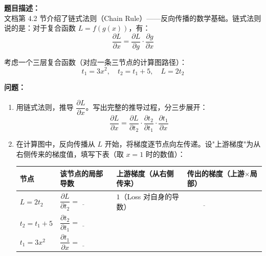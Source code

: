 \documentclass[a4paper,11pt]{ctexart}
\begin{document}
\begin{problembox}
    \textbf{题目描述：}\\
    文档第 4.2 节介绍了链式法则（Chain Rule）——反向传播的数学基础。链式法则说的是：对于复合函数 $L = f(g(x))$，有：
    \[
    \frac{\partial L}{\partial x} = \frac{\partial L}{\partial g} \cdot \frac{\partial g}{\partial x}
    \]

    \vspace{0.3cm}
    考虑一个三层复合函数（对应一条三节点的计算图路径）：
    \[
    t_1 = 3x^2, \quad t_2 = t_1 + 5, \quad L = 2t_2
    \]

    \textbf{问题：}
    \begin{enumerate}[(1)]
        \item 用链式法则，推导 $\dfrac{\partial L}{\partial x}$。写出完整的推导过程，分三步展开：
        \[
        \frac{\partial L}{\partial x} = \frac{\partial L}{\partial t_2} \cdot \frac{\partial t_2}{\partial t_1} \cdot \frac{\partial t_1}{\partial x}
        \]

        \item 在计算图中，反向传播从 $L$ 开始，将梯度逐节点向左传递。设"上游梯度"为从右侧传来的梯度值，填写下表（取 $x=1$ 时的数值）：

        \begin{center}
        \begin{tabular}{p{1.5cm} p{3.5cm} p{3.5cm} p{3.0cm}}
            \toprule
            节点 & 该节点的局部导数 & 上游梯度（从右侧传来） & 传出的梯度（上游$\times$局部） \\
            \midrule
            $L=2t_2$ & $\dfrac{\partial L}{\partial t_2} = \underline{\quad}$ & $1$（Loss 对自身的导数） & $\underline{\hspace{2cm}}$ \\[1.5em]
            $t_2=t_1+5$ & $\dfrac{\partial t_2}{\partial t_1} = \underline{\quad}$ & \underline{\hspace{2cm}} & \underline{\hspace{2cm}} \\[1.5em]
            $t_1=3x^2$ & $\dfrac{\partial t_1}{\partial x} = \underline{\quad}$ & \underline{\hspace{2cm}} & \underline{\hspace{2cm}} \\
            \bottomrule
        \end{tabular}
        \end{center}


\end{enumerate}
\end{problembox}
\end{document}
